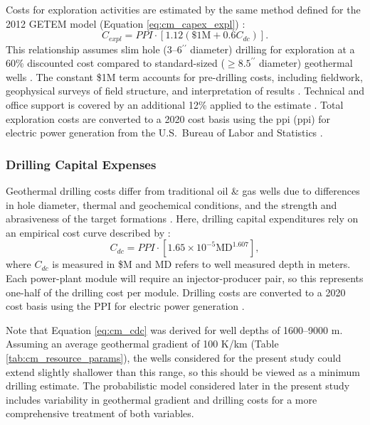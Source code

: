 Costs for exploration activities are estimated by the same method defined for the 2012 GETEM model (Equation \ref{eq:cm_capex_expl}) \citep{eere_getem_2012}: 
\begin{equation}
\label{eq:cm_capex_expl}
    C_{expl} = PPI \cdot \left[ 1.12 %
    (\$1\text{M} + 0.6%
    C_{dc}) \right].
\end{equation}
This relationship assumes slim hole (3--6$^{\prime\prime}$ diameter) drilling for exploration at a 60\% discounted cost compared to standard-sized ($\geq8.5^{\prime\prime}$ diameter) geothermal wells \citep{eere_getem_2012}. The constant \$1M term accounts for pre-drilling costs, including fieldwork, geophysical surveys of field structure, and interpretation of results \citep{eere_getem_2012}. Technical and office support is covered by an additional 12\% applied to the estimate \citep{eere_getem_2012}. Total exploration costs are converted to a 2020 cost basis using the \acrlong{ppi} (\acrshort{ppi}) for electric power generation from the U.S.\ Bureau of Labor and Statistics \citep{us_bls_ppi_2021}.

\subsubsection{Drilling Capital Expenses} \label{ch4:cm_capex_dc}

Geothermal drilling costs differ from traditional oil \& gas wells due to differences in hole diameter, thermal and geochemical conditions, and the strength and abrasiveness of the target formations \citep{lowry_geovision_2017}. Here, drilling capital expenditures rely on an empirical cost curve described by \citet[Eq. 4,\ ][]{beckers_introducing_2013}:
\begin{equation}
\label{eq:cm_cdc}
    C_{dc} = PPI \cdot \left[ 1.65 \times 10^{-5} %
    \text{MD}^{1.607}\right],
\end{equation}
where $C_{dc}$ is measured in \$M and MD refers to well measured depth in meters. Each power-plant module will require an injector-producer pair, so this represents one-half of the drilling cost per module. Drilling costs are converted to a 2020 cost basis using the PPI for electric power generation \citep{us_bls_ppi_2021}. 

Note that Equation \ref{eq:cm_cdc} was derived for well depths of 1600--9000 m. Assuming an average geothermal gradient of 100 K/km (Table \ref{tab:cm_resource_params}), the wells considered for the present study could extend slightly shallower than this range, so this should be viewed as a minimum drilling estimate. The probabilistic model considered later in the present study includes variability in geothermal gradient and drilling costs for a more comprehensive treatment of both variables.

